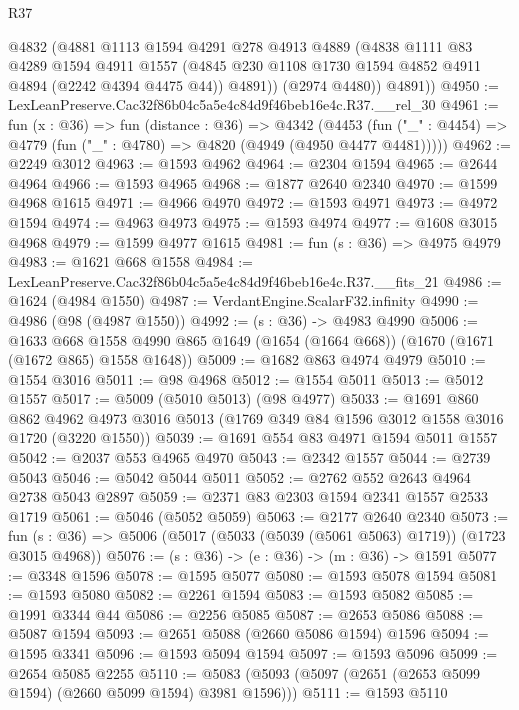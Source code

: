 \begin{lexlean}{R37}
\begin{coremodule}
          @4832
          (@4881
            @1113
            @1594
            @4291
            @278
            @4913
            @4889
            (@4838
              @1111
              @83
              @4289
              @1594
              @4911
              @1557
              (@4845 @230 @1108 @1730 @1594 @4852 @4911 @4894 (@2242 @4394 @4475 @44))
              @4891))
          (@2974 @4480))
        @4891))
@4950 := LexLeanPreserve.Cac32f86b04c5a5e4c84d9f46beb16e4c.R37.__rel_30
@4961 := fun (x : @36) =>
  fun (distance : @36) =>
  @4342
    (@4453 (fun ("_" : @4454) => @4779 (fun ("_" : @4780) => @4820 (@4949 (@4950 @4477 @4481)))))
@4962 := @2249 @3012
@4963 := @1593 @4962
@4964 := @2304 @1594
@4965 := @2644 @4964
@4966 := @1593 @4965
@4968 := @1877 @2640 @2340
@4970 := @1599 @4968 @1615
@4971 := @4966 @4970
@4972 := @1593 @4971
@4973 := @4972 @1594
@4974 := @4963 @4973
@4975 := @1593 @4974
@4977 := @1608 @3015 @4968
@4979 := @1599 @4977 @1615
@4981 := fun (s : @36) => @4975 @4979
@4983 := @1621 @668 @1558
@4984 := LexLeanPreserve.Cac32f86b04c5a5e4c84d9f46beb16e4c.R37.__fits_21
@4986 := @1624 (@4984 @1550)
@4987 := VerdantEngine.ScalarF32.infinity
@4990 := @4986 (@98 (@4987 @1550))
@4992 := (s : @36) -> @4983 @4990
@5006 := @1633
    @668
    @1558
    @4990
    @865
    @1649
    (@1654 (@1664 @668))
    (@1670 (@1671 (@1672 @865) @1558 @1648))
@5009 := @1682 @863 @4974 @4979
@5010 := @1554 @3016
@5011 := @98 @4968
@5012 := @1554 @5011
@5013 := @5012 @1557
@5017 := @5009 (@5010 @5013) (@98 @4977)
@5033 := @1691
    @860
    @862
    @4962
    @4973
    @3016
    @5013
    (@1769 @349 @84 @1596 @3012 @1558 @3016 @1720 (@3220 @1550))
@5039 := @1691 @554 @83 @4971 @1594 @5011 @1557
@5042 := @2037 @553 @4965 @4970
@5043 := @2342 @1557
@5044 := @2739 @5043
@5046 := @5042 @5044 @5011
@5052 := @2762 @552 @2643 @4964 @2738 @5043 @2897
@5059 := @2371 @83 @2303 @1594 @2341 @1557 @2533 @1719
@5061 := @5046 (@5052 @5059)
@5063 := @2177 @2640 @2340
@5073 := fun (s : @36) => @5006 (@5017 (@5033 (@5039 (@5061 @5063) @1719)) (@1723 @3015 @4968))
@5076 := (s : @36) -> (e : @36) -> (m : @36) -> @1591
@5077 := @3348 @1596
@5078 := @1595 @5077
@5080 := @1593 @5078 @1594
@5081 := @1593 @5080
@5082 := @2261 @1594
@5083 := @1593 @5082
@5085 := @1991 @3344 @44
@5086 := @2256 @5085
@5087 := @2653 @5086
@5088 := @5087 @1594
@5093 := @2651 @5088 (@2660 @5086 @1594) @1596
@5094 := @1595 @3341
@5096 := @1593 @5094 @1594
@5097 := @1593 @5096
@5099 := @2654 @5085 @2255
@5110 := @5083 (@5093 (@5097 (@2651 (@2653 @5099 @1594) (@2660 @5099 @1594) @3981 @1596)))
@5111 := @1593 @5110

\end{coremodule}
\end{lexlean}
